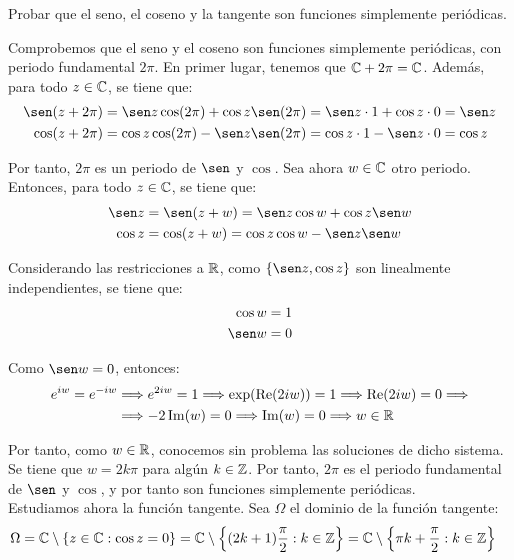 \begin{ejercicio}
    Probar que el seno, el coseno y la tangente son funciones simplemente periódicas.

    Comprobemos que el seno y el coseno son funciones simplemente periódicas, con periodo fundamental $2\pi$. En primer lugar, tenemos que $\mathbb{C}+2\pi=\mathbb{C}$. Además, para todo $z\in \mathbb{C}$, se tiene que:
    \begin{align*}
        \sen(z+2\pi) &= \sen z\cos(2\pi)+\cos z\sen(2\pi) = \sen z\cdot 1 + \cos z\cdot 0 = \sen z\\
        \cos(z+2\pi) &= \cos z\cos(2\pi)-\sen z\sen(2\pi) = \cos z\cdot 1 - \sen z\cdot 0 = \cos z
    \end{align*}

    Por tanto, $2\pi$ es un periodo de $\sen$ y $\cos$. Sea ahora $w\in \mathbb{C}$ otro periodo. Entonces, para todo $z\in \mathbb{C}$, se tiene que:
    \begin{align*}
        \sen z &= \sen(z+w) = \sen z\cos w + \cos z\sen w\\
        \cos z &= \cos(z+w) = \cos z\cos w - \sen z\sen w
    \end{align*}

    Considerando las restricciones a $\mathbb{R}$, como $\{\sen z,\cos z\}$ son linealmente independientes, se tiene que:
    \begin{align*}
        \cos w &= 1 \\
        \sen w &= 0
    \end{align*}

    Como $\sen w=0$, entonces:
    \begin{align*}
        e^{iw} = e^{-iw}&\Longrightarrow e^{2iw} = 1\Longrightarrow \exp(\operatorname{Re}(2iw))=1
        \Longrightarrow \operatorname{Re}(2iw) = 0\Longrightarrow \\ &\Longrightarrow -2\operatorname{Im}(w) = 0\Longrightarrow \operatorname{Im}(w) = 0
        \Longrightarrow w\in \mathbb{R}
    \end{align*}

    Por tanto, como $w\in \mathbb{R}$, conocemos sin problema las soluciones de dicho sistema. Se tiene que $w=2k\pi$ para algún $k\in \mathbb{Z}$. Por tanto, $2\pi$ es el periodo fundamental de $\sen$ y $\cos$, y por tanto son funciones simplemente periódicas.\\

    Estudiamos ahora la función tangente. Sea $\Omega$ el dominio de la función tangente:
    \begin{align*}
        \Omega &= \mathbb{C}\setminus\left\{z\in \mathbb{C} : \cos z = 0\right\} = \mathbb{C}\setminus\left\{(2k+1)\frac{\pi}{2} : k\in \mathbb{Z}\right\}
        = \mathbb{C}\setminus\left\{\pi k +\frac{\pi}{2} : k\in \mathbb{Z}\right\}
    \end{align*}
    

\end{ejercicio}
